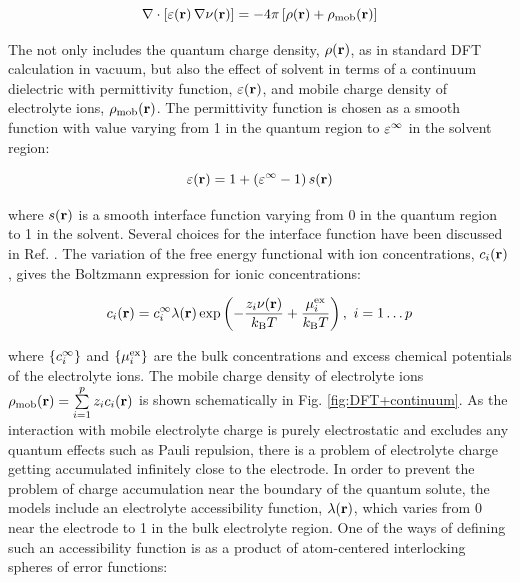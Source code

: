 \documentclass[../main.tex]{subfiles}
\begin{document}
\begin{equation}
    \label{eq:pbe}
    \nabla\cdot\left[\varepsilon\!\left(\mathbf{r}\right)\nabla\nu\!\left(\mathbf{r}\right)\right]=-4\pi\left[\rho\!\left(\mathbf{r}\right)+\rho_{\textrm{mob}}\!\left(\mathbf{r}\right)\right]
\end{equation}

The \pbe{} not only includes the quantum charge density, $\rho\!\left(\mathbf{r}\right)$, as in standard DFT calculation in vacuum, but also the effect of solvent in terms of a continuum dielectric with permittivity function, $\varepsilon\!\left(\mathbf{r}\right)$, and mobile charge density of electrolyte ions, $\rho_{\textrm{mob}}\!\left(\mathbf{r}\right)$. The permittivity function is chosen as a smooth function with value varying from 1 in the quantum region to $\varepsilon^\infty$ in the solvent region:\cite{Nattino2019}

\begin{equation}
    \varepsilon\!\left(\mathbf{r}\right)=1+\left(\varepsilon^\infty-1\right)s\!\left(\mathbf{r}\right)
\end{equation}

where $s\!\left(\mathbf{r}\right)$ is a smooth interface function varying from 0 in the quantum region to 1 in the solvent. Several choices for the interface function have been discussed in Ref. . The variation of the free energy functional with ion concentrations, $c_i\!\left(\mathbf{r}\right)$, gives the Boltzmann expression for ionic concentrations:

\begin{equation}
    \label{eq:cig}
    \ci\ofrvec = \cif\lambda(\rvec) \exp \left(-\frac{z_i\pot(\rvec)}{\kb T} +\frac{\muexi}{\kb T} \right), \ i=1\dots{}p
\end{equation}

where $\{c_i^{\infty}\}$ and $\{\mu_i^\textrm{ex}\}$ are the bulk concentrations and excess chemical potentials of the electrolyte ions. The mobile charge density of electrolyte ions $\rho_{\textrm{mob}}\!\left(\mathbf{r}\right)=\sum\limits_{i=1}^pz_ic_i\!\left(\mathbf{r}\right)$ is shown schematically in Fig. \ref{fig:DFT+continuum}. As the interaction with mobile electrolyte charge is purely electrostatic and excludes any quantum effects such as Pauli repulsion, there is a problem of electrolyte charge getting accumulated infinitely close to the electrode. In order to prevent the problem of charge accumulation near the boundary of the quantum solute, the models include an electrolyte accessibility function, $\lambda\!\left(\mathbf{r}\right)$, which varies from 0 near the electrode to 1 in the bulk electrolyte region.\cite{Fisicaro2017, Sundararaman2018, Stein2019} One of the ways of defining such an accessibility function is as a product of atom-centered interlocking spheres of error functions:\cite{Dziedzic2020}
\end{document}
